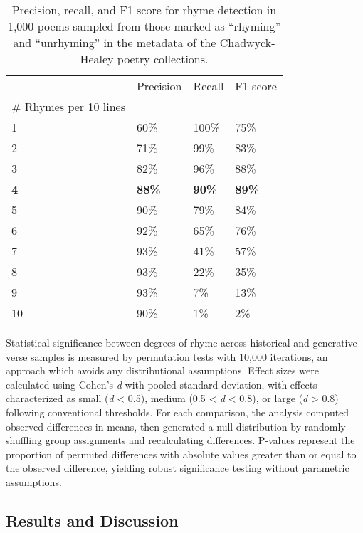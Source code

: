\documentclass{simple-humanities}         %
\begin{document}
\begin{table}[H]
  \centering
  \small
  \singlespacing
  \begin{tabular}{llll}
    \toprule
     & Precision & Recall & F1 score \\
    \# Rhymes per 10 lines &  &  &  \\
    \midrule
    1 & 60\% & 100\% & 75\% \\
    2 & 71\% & 99\% & 83\% \\
    3 & 82\% & 96\% & 88\% \\
    \textbf{4} & \textbf{88\%} & \textbf{90\%} & \textbf{89\%} \\
    5 & 90\% & 79\% & 84\% \\
    6 & 92\% & 65\% & 76\% \\
    7 & 93\% & 41\% & 57\% \\
    8 & 93\% & 22\% & 35\% \\
    9 & 93\% & 7\% & 13\% \\
    10 & 90\% & 1\% & 2\% \\
    \bottomrule
    \end{tabular}
  \caption{Precision, recall, and F1 score for rhyme detection in 1,000 poems sampled from those marked as ``rhyming'' and ``unrhyming'' in the metadata of the Chadwyck-Healey poetry collections.}
  \label{tab:rhyme_validation}
  \end{table}

  Statistical significance between degrees of rhyme across historical and generative verse samples is measured by permutation tests with 10,000 iterations, an approach which avoids any distributional assumptions.
  Effect sizes were calculated using Cohen's \emph{d} with pooled standard deviation, with effects characterized as small (\emph{d} < 0.5), medium (0.5 < \emph{d} < 0.8), or large (\emph{d} > 0.8) following conventional thresholds.
  For each comparison, the analysis computed observed differences in means, then generated a null distribution by randomly shuffling group assignments and recalculating differences.
  P-values represent the proportion of permuted differences with absolute values greater than or equal to the observed difference, yielding robust significance testing without parametric assumptions.

\subsection{Results and Discussion}
\end{document}
